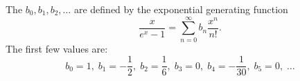 The  $b_0, b_1, b_2, \ldots$ are defined by the exponential generating function
$$\frac{x}{e^x - 1} = \sum_{n=0}^{\infty} b_n \frac{x^n}{n!}.$$
The first few values are:
$$b_0 = 1,\; b_1 = -\frac{1}{2},\; b_2 = \frac{1}{6},\; b_3 = 0,\; b_4 = -\frac{1}{30},\; b_5 = 0,\; \ldots$$
